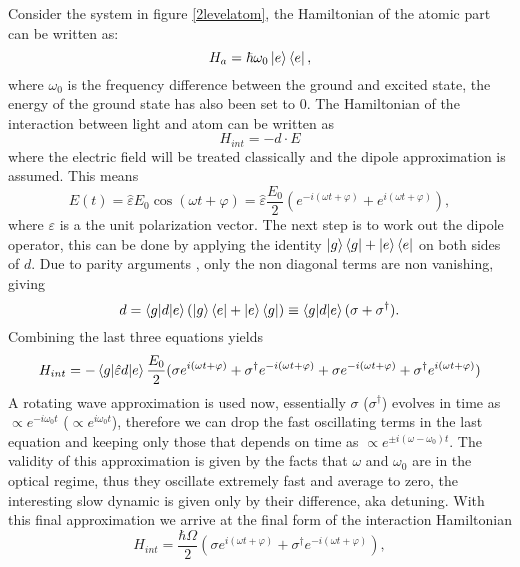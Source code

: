 Consider the system in figure \ref{2levelatom}, the Hamiltonian of the atomic part can be written as:
\begin{equation}
H_a = \hbar\omega_0 \ket{e}\bra{e},
\end{equation}
where $\omega_0$ is the frequency difference between the ground and excited state, the energy of the ground state has also been set to 0. The Hamiltonian of the interaction between light and atom can be written as \cite{steck}
\begin{equation}
H_{int} = -d\cdot E
\end{equation}
where the electric field will be treated classically and the dipole approximation is assumed. This means
\begin{equation}
E(t) = \hat{\varepsilon} E_0 \cos(\omega t+\varphi) = \hat{\varepsilon} \frac{E_0}{2} \left(e^{-i(\omega t+\varphi)} + e^{i(\omega t+\varphi)}\right),
\end{equation}
where $\varepsilon$ is a the unit polarization vector. The next step is to work out the dipole operator, this can be done by applying the identity $\ket{g}\bra{g} + \ket{e}\bra{e}$ on both sides of $d$. Due to parity arguments \cite{steck}, only the non diagonal terms are non vanishing, giving
\begin{equation}
d = \braket{g|d|e}\left(\ket{g}\bra{e} + \ket{e}\bra{g}\right) \equiv \braket{g|d|e}(\sigma + \sigma^\dagger).
\end{equation}
Combining the last three equations yields
\begin{equation}
H_{int} = - \braket{g|\hat{\varepsilon} d|e}\frac{E_0}{2}(\sigma e^{i(\omega t+\varphi)} + \sigma^\dagger e^{-i(\omega t+\varphi)} + \sigma e^{-i(\omega t+\varphi)} + \sigma^\dagger e^{i(\omega t+\varphi)})
\end{equation}
A rotating wave approximation is used now, essentially $\sigma$ ($\sigma^\dagger$) evolves in time as $\propto e^{-i\omega_0 t}$ ($\propto e^{i\omega_0 t}$), therefore we can drop the fast oscillating terms in the last equation and keeping only those that depends on time as $\propto e^{\pm i(\omega-\omega_0 )t}$. The validity of this approximation is given by the facts that $\omega$ and $\omega_0$ are in the optical regime, thus they oscillate extremely fast and average to zero, the interesting slow dynamic is given only by their difference, aka detuning.
With this final approximation we arrive at the final form of the interaction Hamiltonian
\begin{equation}
H_{int} = \frac{\hbar \Omega}{2}(\sigma e^{i(\omega t+\varphi)} + \sigma^\dagger e^{-i(\omega t+\varphi)}),
\end{equation}
